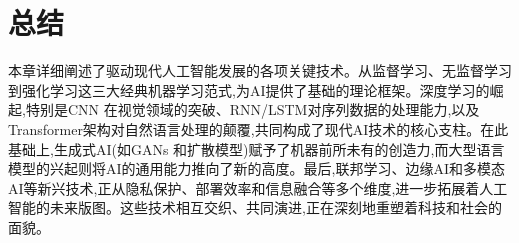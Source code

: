 \section{总结}
\label{sec:conclusion_chap2}
本章详细阐述了驱动现代人工智能发展的各项关键技术。从监督学习、无监督学习到强化学习这三大经典机器学习范式,为AI提供了基础的理论框架。深度学习的崛起,特别是CNN 在视觉领域的突破、RNN/LSTM对序列数据的处理能力,以及Transformer架构对自然语言处理的颠覆,共同构成了现代AI技术的核心支柱。在此基础上,生成式AI(如GANs 和扩散模型)赋予了机器前所未有的创造力,而大型语言模型的兴起则将AI的通用能力推向了新的高度。最后,联邦学习、边缘AI和多模态 AI等新兴技术,正从隐私保护、部署效率和信息融合等多个维度,进一步拓展着人工智能的未来版图。这些技术相互交织、共同演进,正在深刻地重塑着科技和社会的面貌。
